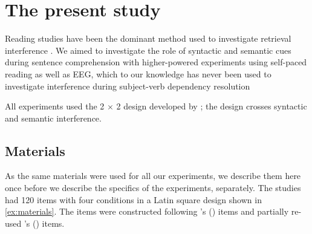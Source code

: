 \documentclass[a4paper, man, floatsintext]{apa7}
\begin{document}
\section{The present study}

Reading studies have been the dominant method used to investigate retrieval interference \parencite[see the review in][]{jaeger_etal_2017}.  We aimed to investigate the role of syntactic and semantic cues during sentence comprehension with higher-powered experiments using  self-paced reading as well as EEG, which to our knowledge has never been used to investigate interference during subject-verb dependency resolution

All experiments used the 2 $\times$ 2 design developed by \citet{vandyke07}; the design crosses syntactic and semantic interference. 

\subsection{Materials}

As the same materials were used for all our experiments, we describe them here once before we describe the specifics of the experiments, separately. The studies had 120 items with four conditions in a Latin square design shown in \ref{ex:materials}. The items were constructed following \citeauthor{vandyke07}'s (\citeyear{vandyke07}) items and partially re-used  \citeauthor{mertzen}'s (\citeyear{mertzen}) items.
\end{document}

